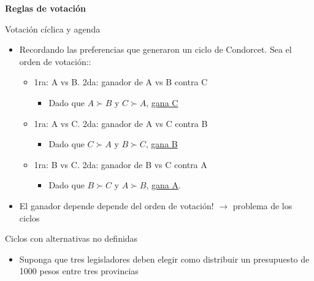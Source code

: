 \documentclass[
  ignorenonframetext,
]{beamer}
\providecommand{\tightlist}{%
  \setlength{\itemsep}{0pt}\setlength{\parskip}{0pt}}\usepackage{longtable,booktabs,array}
\begin{document}
\begin{frame}{\textbf{Reglas de votación}}
\begin{block}{Votación cíclica y agenda}
\protect\hypertarget{votaciuxf3n-cuxedclica-y-agenda}{}
\begin{itemize}
\tightlist
\item
  Recordando las preferencias que generaron un ciclo de Condorcet. Sea
  el orden de votación::

  \begin{itemize}
  \tightlist
  \item
    1ra: A vs B. 2da: ganador de A vs B contra C

    \begin{itemize}
    \tightlist
    \item
      Dado que \(A \succ B\) y \(C \succ A\), \uline{gana C}
    \end{itemize}
  \item
    1ra: A vs C. 2da: ganador de A vs C contra B

    \begin{itemize}
    \tightlist
    \item
      Dado que \(C \succ A\) y \(B \succ C\), \uline{gana B}
    \end{itemize}
  \item
    1ra: B vs C. 2da: ganador de B vs C contra A

    \begin{itemize}
    \tightlist
    \item
      Dado que \(B \succ C\) y \(A \succ B\), \uline{gana A}.
    \end{itemize}
  \end{itemize}
\item
  El ganador depende depende del orden de votación! \(\longrightarrow\)
  problema de los ciclos
\end{itemize}
\end{block}

\begin{block}{Ciclos con alternativas no definidas}
\protect\hypertarget{ciclos-con-alternativas-no-definidas}{}
\begin{itemize}
\tightlist
\item
  Suponga que tres legisladores deben elegir como distribuir un
  presupuesto de 1000 pesos entre tres provincias


\end{itemize}
\end{block}
\end{frame}
\end{document}
